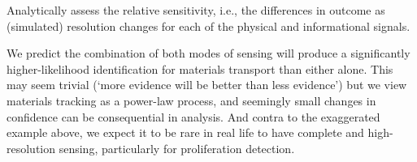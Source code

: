 \documentclass{article} %
\begin{document}






Analytically assess the relative sensitivity, i.e., the differences in outcome as (simulated) resolution changes for each of the physical and informational signals. 

We predict the combination of both modes of sensing will produce a significantly higher-likelihood identification for materials transport than either alone. This may seem trivial (`more evidence will be better than less evidence') but we view materials tracking as a power-law process, and seemingly small changes in confidence can be consequential in analysis. And contra to the exaggerated example above, we expect it to be rare in real life to have complete and high-resolution sensing, particularly for proliferation detection.
\end{document}
